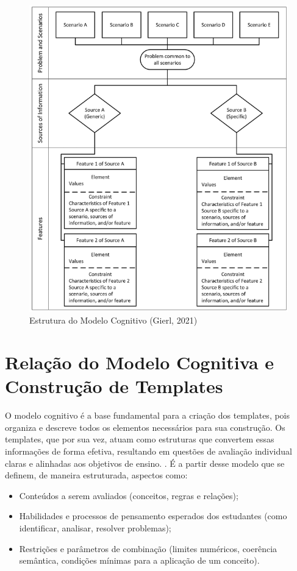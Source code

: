 \begin{figure}[ht]
	\centering
	\includegraphics[width=14cm]{./imagens/capitulo4/cognitive-model}
	\caption{Estrutura do Modelo Cognitivo (Gierl, 2021)}
	\label{fig:cognitive-model}
\end{figure}

\section{Relação do Modelo Cognitiva e Construção de Templates }

O modelo cognitivo é a base fundamental para a criação dos templates, pois organiza e descreve todos os elementos necessários para sua construção. Os templates, que por sua vez, atuam como estruturas que convertem essas informações de forma efetiva, resultando em questões de avaliação individual claras e alinhadas aos objetivos de ensino.
\cite{gierl2016, gierl2017, keehner2017, gierlbulutzhang2018 }. É a partir desse modelo que se definem, de maneira estruturada, aspectos como:

\begin{itemize} \item Conteúdos a serem avaliados (conceitos, regras e relações); \item Habilidades e processos de pensamento esperados dos estudantes (como identificar, analisar, resolver problemas); \item Restrições e parâmetros de combinação (limites numéricos, coerência semântica, condições mínimas para a aplicação de um conceito). \end{itemize}





